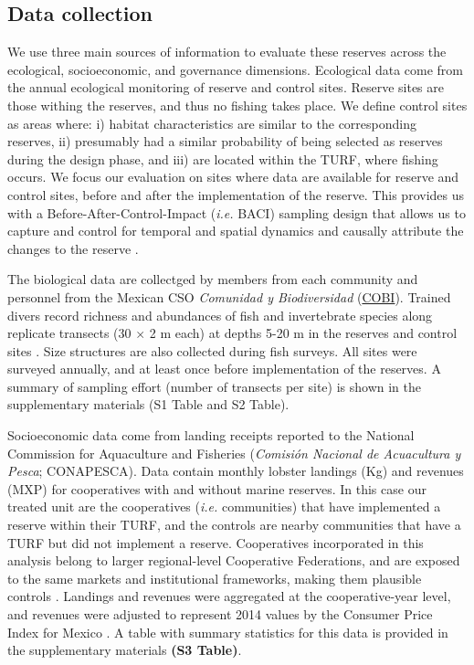 \documentclass{frontiersSCNS}
\begin{document}
\hypertarget{data-collection}{%
\subsection{Data collection}\label{data-collection}}

We use three main sources of information to evaluate these reserves
across the ecological, socioeconomic, and governance dimensions.
Ecological data come from the annual ecological monitoring of reserve
and control sites. Reserve sites are those withing the reserves, and
thus no fishing takes place. We define control sites as areas where: i)
habitat characteristics are similar to the corresponding reserves, ii)
presumably had a similar probability of being selected as reserves
during the design phase, and iii) are located within the TURF, where
fishing occurs. We focus our evaluation on sites where data are
available for reserve and control sites, before and after the
implementation of the reserve. This provides us with a
Before-After-Control-Impact (\emph{i.e.} BACI) sampling design that
allows us to capture and control for temporal and spatial dynamics
\citep{stewartoaten_1986,depalma_2018} and causally attribute the
changes to the reserve
\citep{francinifilho_2008,moland_2013,Villasenor-Derbez_2018}.

The biological data are collectged by members from each community and
personnel from the Mexican CSO \emph{Comunidad y Biodiversidad}
(\href{www.cobi.org.mx}{COBI}). Trained divers record richness and
abundances of fish and invertebrate species along replicate transects
(30 \(\times\) 2 m each) at depths 5-20 m in the reserves and control
sites \citep{fulton_2018,fulton_2019,suman_2010-ez}. Size structures are
also collected during fish surveys. All sites were surveyed annually,
and at least once before implementation of the reserves. A summary of
sampling effort (number of transects per site) is shown in the
supplementary materials (S1 Table and S2 Table).

Socioeconomic data come from landing receipts reported to the National
Commission for Aquaculture and Fisheries (\emph{Comisión Nacional de
Acuacultura y Pesca}; CONAPESCA). Data contain monthly lobster landings
(Kg) and revenues (MXP) for cooperatives with and without marine
reserves. In this case our treated unit are the cooperatives
(\emph{i.e.} communities) that have implemented a reserve within their
TURF, and the controls are nearby communities that have a TURF but did
not implement a reserve. Cooperatives incorporated in this analysis
belong to larger regional-level Cooperative Federations, and are exposed
to the same markets and institutional frameworks, making them plausible
controls \citep{mccay_2017,ayer_2018}. Landings and revenues were
aggregated at the cooperative-year level, and revenues were adjusted to
represent 2014 values by the Consumer Price Index for Mexico
\citep{oecd_2017}. A table with summary statistics for this data is
provided in the supplementary materials \textbf{(S3 Table)}.
\end{document}
